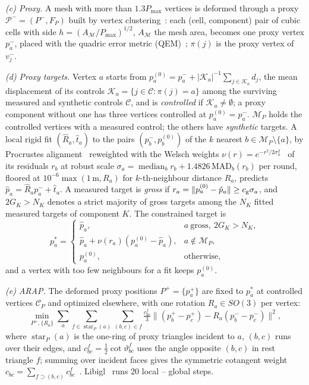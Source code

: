 \textit{(c) Proxy.}
A mesh with more than $1.3P_{\max}$ vertices is deformed through a proxy
$\mathcal P^-=(P^-,F_P)$ built by vertex
clustering~\cite{rossignac1993vertexclustering}: each (cell, component) pair
of cubic cells with side $h=(A_{\mathcal M}/P_{\max})^{1/2}$, $A_{\mathcal M}$
the mesh area, becomes one proxy vertex $p_a^-$, placed with the quadric
error metric (QEM)~\cite{garland1997qem}; $\pi(j)$ is the proxy vertex of
$v_j^-$.

\textit{(d) Proxy targets.}
Vertex $a$ starts from
$p_a^{(0)}=p_a^-+|\mathcal K_a|^{-1}\sum_{j\in\mathcal K_a}d_j$, the mean
displacement of its controls $\mathcal K_a=\{j\in\mathcal C:\pi(j)=a\}$
among the surviving measured and synthetic controls $\mathcal C$, and is
\emph{controlled} if $\mathcal K_a\neq\emptyset$; a proxy component without
one has three vertices controlled at $p_a^{(0)}=p_a^-$. $\mathcal M_P$ holds
the controlled vertices with a measured control; the others have
\emph{synthetic} targets. A local rigid fit $(\hat R_a,\hat t_a)$ to the pairs
$(p_b^-,p_b^{(0)})$ of the $k$ nearest $b\in\mathcal M_P\setminus\{a\}$, by
Procrustes alignment~\cite{schoenemann1966procrustes} reweighted with the
Welsch weights $\nu(r)=e^{-r^2/2\sigma_a^2}$~\cite{yao2020welsch} of its
residuals $r_b$ at robust scale
$\sigma_a=\operatorname{median}_br_b+1.4826\,\mathrm{MAD}_b(r_b)$ per round,
floored at $10^{-6}\max(1\,\mathrm{m},R_a)$ for $k$-th-neighbour distance $R_a$,
predicts
$\hat p_a=\hat R_ap_a^-+\hat t_a$. A measured target is \emph{gross} if
$r_a=\|p_a^{(0)}-\hat p_a\|\ge c_{\rm g}\sigma_a$, and $2G_K>N_K$ denotes a
strict majority of gross targets among the $N_K$ fitted measured targets of
component $K$. The constrained target is
\begin{equation}
p_a^*=\begin{cases}
\hat p_a, & a\ \text{gross},\ 2G_K>N_K,\\
\hat p_a+\nu(r_a)(p_a^{(0)}-\hat p_a), & a\notin\mathcal M_P,\\
p_a^{(0)}, & \text{otherwise},
\end{cases}
\label{eq:welsch}
\end{equation}
and a vertex with too few neighbours for a fit keeps $p_a^{(0)}$.

\textit{(e) ARAP.}
The deformed proxy positions $P^+=\{p_a^+\}$ are fixed to $p_a^*$ at
controlled vertices $\mathcal C_P$ and optimized elsewhere, with one rotation
$R_a\in SO(3)$ per vertex:
\begin{equation}
\min_{P^+,\{R_a\}}\sum_{a}\!\sum_{f\in\operatorname{star}_P(a)}
\sum_{(b,c)\in f}\!\tfrac{c^f_{bc}}{3}
\|(p_b^+-p_c^+)-R_a(p_b^--p_c^-)\|^2,
\label{eq:arap}
\end{equation}
where $\operatorname{star}_P(a)$ is the one-ring of proxy triangles incident
to $a$, $(b,c)$ runs over their edges, and
$c^f_{bc}=\tfrac12\cot\vartheta^f_{bc}$ uses the angle opposite $(b,c)$ in
rest triangle $f$; summing over incident faces gives the symmetric
cotangent weight $c_{bc}=\sum_{f\supset(b,c)}c^f_{bc}$~\cite{10.1007/978-3-662-05105-4_2}.
Libigl~\cite{libigl} runs 20 local -- global steps.

